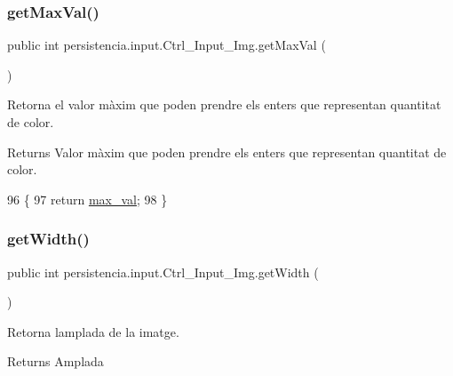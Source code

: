 \subsubsection{\texorpdfstring{get\+Max\+Val()}{getMaxVal()}}
{\footnotesize\ttfamily public int persistencia.\+input.\+Ctrl\+\_\+\+Input\+\_\+\+Img.\+get\+Max\+Val (\begin{DoxyParamCaption}{ }\end{DoxyParamCaption})\hspace{0.3cm}{\ttfamily [inline]}}



Retorna el valor màxim que poden prendre els enters que representan quantitat de color. 

\begin{DoxyReturn}{Returns}
Valor màxim que poden prendre els enters que representan quantitat de color. 
\end{DoxyReturn}

\begin{DoxyCode}
96                            \{
97         \textcolor{keywordflow}{return} \hyperlink{classpersistencia_1_1input_1_1Ctrl__Input__Img_a1b8fa2d000a1d5d873be62d1f609e4be}{max\_val};
98     \}
\end{DoxyCode}
\mbox{\label{classpersistencia_1_1input_1_1Ctrl__Input__Img_ab4cda237a52c99efb4411e0e86f3d3a2}} 
\subsubsection{\texorpdfstring{get\+Width()}{getWidth()}}
{\footnotesize\ttfamily public int persistencia.\+input.\+Ctrl\+\_\+\+Input\+\_\+\+Img.\+get\+Width (\begin{DoxyParamCaption}{ }\end{DoxyParamCaption})\hspace{0.3cm}{\ttfamily [inline]}}



Retorna l\textquotesingle{}amplada de la imatge. 

\begin{DoxyReturn}{Returns}
Amplada 
\end{DoxyReturn}


